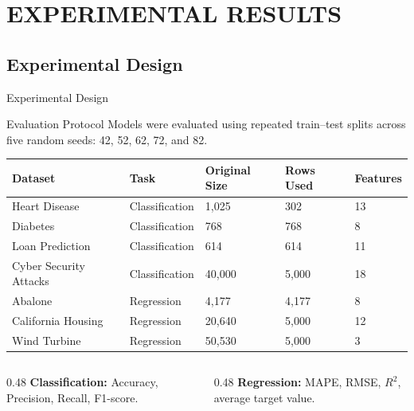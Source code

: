 \section{EXPERIMENTAL RESULTS}
\subsection{Experimental Design}

\begin{frame}[t]{Experimental Design}
\scriptsize
\vspace{-0.12cm}
\begin{block}{Evaluation Protocol}
Models were evaluated using repeated train--test splits across five random seeds: 42, 52, 62, 72, and 82.
\end{block}

\vspace{0.08cm}
\begin{table}
\centering
\renewcommand{\arraystretch}{1.04}
\setlength{\tabcolsep}{3pt}
\begin{tabularx}{\textwidth}{p{3.0cm} p{2.4cm} p{2.0cm} p{2.0cm} X}
\toprule
\textbf{Dataset} & \textbf{Task} & \textbf{Original Size} & \textbf{Rows Used} & \textbf{Features} \\
\midrule
Heart Disease & Classification & 1,025 & 302 & 13 \\
Diabetes & Classification & 768 & 768 & 8 \\
Loan Prediction & Classification & 614 & 614 & 11 \\
Cyber Security Attacks & Classification & 40,000 & 5,000 & 18 \\
Abalone & Regression & 4,177 & 4,177 & 8 \\
California Housing & Regression & 20,640 & 5,000 & 12 \\
Wind Turbine & Regression & 50,530 & 5,000 & 3 \\
\bottomrule
\end{tabularx}
\end{table}

\vspace{0.05cm}
\begin{columns}[T,totalwidth=\textwidth]
\begin{column}{0.48\textwidth}
\textbf{Classification:} Accuracy, Precision, Recall, F1-score.
\end{column}
\begin{column}{0.48\textwidth}
\textbf{Regression:} MAPE, RMSE, $R^2$, average target value.
\end{column}
\end{columns}
\end{frame}

